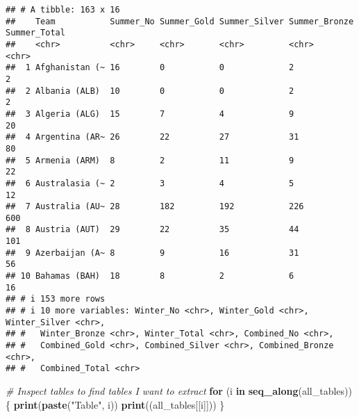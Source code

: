 \documentclass[
]{article}
\newenvironment{Shaded}{\begin{snugshade}}{\end{snugshade}}
\newcommand{\CommentTok}[1]{\textcolor[rgb]{0.56,0.35,0.01}{\textit{#1}}}
\newcommand{\ControlFlowTok}[1]{\textcolor[rgb]{0.13,0.29,0.53}{\textbf{#1}}}
\newcommand{\FunctionTok}[1]{\textcolor[rgb]{0.13,0.29,0.53}{\textbf{#1}}}
\newcommand{\NormalTok}[1]{#1}
\newcommand{\StringTok}[1]{\textcolor[rgb]{0.31,0.60,0.02}{#1}}
\begin{document}
\begin{verbatim}
## # A tibble: 163 x 16
##    Team           Summer_No Summer_Gold Summer_Silver Summer_Bronze Summer_Total
##    <chr>          <chr>     <chr>       <chr>         <chr>         <chr>       
##  1 Afghanistan (~ 16        0           0             2             2           
##  2 Albania (ALB)  10        0           0             2             2           
##  3 Algeria (ALG)  15        7           4             9             20          
##  4 Argentina (AR~ 26        22          27            31            80          
##  5 Armenia (ARM)  8         2           11            9             22          
##  6 Australasia (~ 2         3           4             5             12          
##  7 Australia (AU~ 28        182         192           226           600         
##  8 Austria (AUT)  29        22          35            44            101         
##  9 Azerbaijan (A~ 8         9           16            31            56          
## 10 Bahamas (BAH)  18        8           2             6             16          
## # i 153 more rows
## # i 10 more variables: Winter_No <chr>, Winter_Gold <chr>, Winter_Silver <chr>,
## #   Winter_Bronze <chr>, Winter_Total <chr>, Combined_No <chr>,
## #   Combined_Gold <chr>, Combined_Silver <chr>, Combined_Bronze <chr>,
## #   Combined_Total <chr>
\end{verbatim}

\begin{Shaded}
\begin{Highlighting}[]
\CommentTok{\# Inspect tables to find tables I want to extract}
\ControlFlowTok{for}\NormalTok{ (i }\ControlFlowTok{in} \FunctionTok{seq\_along}\NormalTok{(all\_tables)) \{}
  \FunctionTok{print}\NormalTok{(}\FunctionTok{paste}\NormalTok{(}\StringTok{"Table"}\NormalTok{, i))}
  \FunctionTok{print}\NormalTok{((all\_tables[[i]]))}
\NormalTok{\}}
\end{Highlighting}
\end{Shaded}
\end{document}
